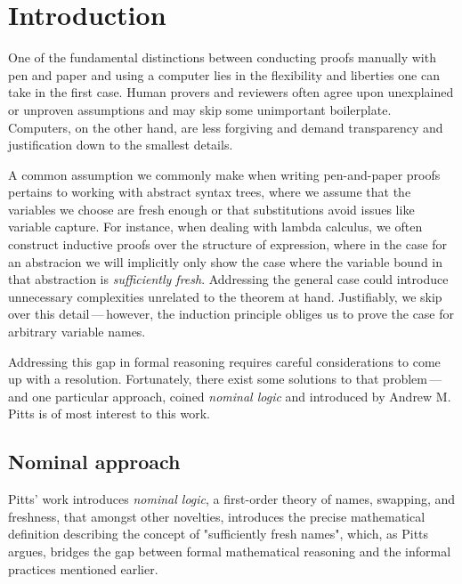\documentclass[english, mgr]{iithesis}
\author         {Dominik Gulczyński}
\date           {\today}                     %
\renewcommand{\it}[1]{\textit{#1}}
\newcommand{\mdash}{\,---\,}
\def\-{{\mdash}}
\begin{document}
\chapter{Introduction}
One of the fundamental distinctions between conducting proofs manually with pen and paper
and using a computer lies in the flexibility and liberties one can take in the first case.
Human provers and reviewers often agree upon unexplained or unproven assumptions
and may skip some unimportant boilerplate.
Computers, on the other hand, are less forgiving
and demand transparency and justification down to the smallest details.

A common assumption we commonly make when writing pen-and-paper proofs pertains to
working with abstract syntax trees,
where we assume that the variables we choose are fresh enough
or that substitutions avoid issues like variable capture.
For instance, when dealing with lambda calculus, we often construct inductive proofs
over the structure of expression, where in the case for an abstracion we will implicitly only show
the case where the variable bound in that abstraction is \it{sufficiently fresh}.
Addressing the general case could introduce unnecessary complexities unrelated to the theorem at hand.
Justifiably, we skip over this detail\-however, the induction principle obliges us to prove the case for arbitrary variable names.

Addressing this gap in formal reasoning requires careful considerations to come up with a resolution.
Fortunately, there exist some solutions to that problem\-and one particular
approach, coined \it{nominal logic} and introduced by Andrew M. Pitts\cite{nominal-logic} is of most interest to this work.

\section{Nominal approach}
Pitts' work introduces \it{nominal logic}, a first-order theory of names, swapping, and freshness,
that amongst other novelties, introduces the precise mathematical definition
describing the concept of "sufficiently fresh names",
which, as Pitts argues, bridges the gap between formal mathematical reasoning and the informal practices mentioned earlier.
\end{document}

